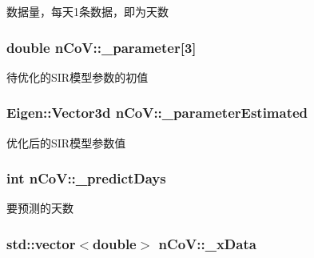 数据量，每天1条数据，即为天数 

\subsubsection[{\texorpdfstring{\+\_\+parameter}{_parameter}}]{\setlength{\rightskip}{0pt plus 5cm}double n\+Co\+V\+::\+\_\+parameter\mbox{[}3\mbox{]}\hspace{0.3cm}{\ttfamily [private]}}\hypertarget{classnCoV_ae34cb58fd08703599158b69853b659a2}{}\label{classnCoV_ae34cb58fd08703599158b69853b659a2}


待优化的\+S\+I\+R模型参数的初值 

\subsubsection[{\texorpdfstring{\+\_\+parameter\+Estimated}{_parameterEstimated}}]{\setlength{\rightskip}{0pt plus 5cm}Eigen\+::\+Vector3d n\+Co\+V\+::\+\_\+parameter\+Estimated\hspace{0.3cm}{\ttfamily [private]}}\hypertarget{classnCoV_a6980bf4492a8ce437b15ac9625eacfce}{}\label{classnCoV_a6980bf4492a8ce437b15ac9625eacfce}


优化后的\+S\+I\+R模型参数值 

\subsubsection[{\texorpdfstring{\+\_\+predict\+Days}{_predictDays}}]{\setlength{\rightskip}{0pt plus 5cm}int n\+Co\+V\+::\+\_\+predict\+Days\hspace{0.3cm}{\ttfamily [private]}}\hypertarget{classnCoV_a71d73f9132ff05684bb8f830bd1f4232}{}\label{classnCoV_a71d73f9132ff05684bb8f830bd1f4232}


要预测的天数 

\subsubsection[{\texorpdfstring{\+\_\+x\+Data}{_xData}}]{\setlength{\rightskip}{0pt plus 5cm}std\+::vector$<$double$>$ n\+Co\+V\+::\+\_\+x\+Data\hspace{0.3cm}{\ttfamily [private]}}\hypertarget{classnCoV_a11802f3972f62a07b77b1847f1d010a8}{}\label{classnCoV_a11802f3972f62a07b77b1847f1d010a8}


